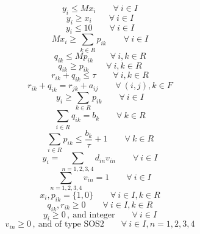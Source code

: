 \documentclass[12pt, fleqn]{article}
\begin{document}
\begin{equation}
    y_{i} \leq M x_{i} \qquad \forall\ i \in I
\end{equation}
\begin{equation}
    y_{i} \geq x_{i} \qquad \forall\ i \in I
\end{equation}
\begin{equation}
    y_{i} \leq 10 \qquad \forall\ i \in I
\end{equation}
\begin{equation}
    M x_{i} \geq \sum\limits_{k \in R}{p_{ik}} \qquad \forall\ i \in I
\end{equation}
\begin{equation}
    q_{ik} \leq M p_{ik} \qquad \forall\ i, k \in R
\end{equation}
\begin{equation}
    q_{ik} \geq p_{ik} \qquad \forall\ i, k \in R
\end{equation}
\begin{equation}
    r_{ik} + q_{ik} \leq \tau \qquad \forall\ i, k \in R
\end{equation}
\begin{equation}
    r_{ik} + q_{ik} = r_{jk} + a_{ij} \qquad \forall\ (i,j), k \in F
\end{equation}
\begin{equation}
    y_{i} \geq \sum\limits_{k \in R}{p_{ik}} \qquad \forall\ i \in I
\end{equation}
\begin{equation}
    \sum\limits_{i \in R}q_{ik} = b_{k} \qquad \forall\ k \in R
\end{equation}
\begin{equation}
    \sum\limits_{i \in R}p_{ik} \leq \frac{b_{k}}{\tau} + 1 \qquad \forall\ k \in R
\end{equation}
\begin{equation}
    y_{i} = \sum\limits_{n = 1,2,3,4}{d_{in} v_{in}} \qquad \forall\ i \in I
\end{equation}
\begin{equation}
    \sum\limits_{n = 1,2,3,4}{v_{in}} = 1 \qquad \forall\ i \in I
\end{equation}
\begin{equation}
    x_{i}, p_{ik} = \{1,0\} \qquad \forall\ i \in I, k \in R
\end{equation}
\begin{equation}
    q_{ik}, r_{ik} \geq 0 \qquad \forall\ i \in I, k \in R
\end{equation}
\begin{equation}
    y_{i} \geq 0\,,\ \text{and integer} \qquad \forall\ i \in I
\end{equation}
\begin{equation}
    v_{in} \geq 0\,,\ \text{and of type SOS2} \qquad \forall\ i \in I, n = 1,2,3,4
\end{equation}
\end{document}
